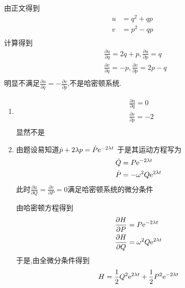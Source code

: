 \begin{solution}
    由正文得到
    \begin{align*}
        u&=q^2+qp\\
        v&=p^2-qp\\
    \end{align*}
    计算得到
    \begin{align*}
        &\frac{\partial u}{\partial q}=2q+p,\frac{\partial u}{\partial p}=q\\
        &\frac{\partial v}{\partial q}=-p,\frac{\partial v}{\partial p}=2p-q\\
    \end{align*}
    明显不满足$\frac{\partial u}{\partial q}=-\frac{\partial v}{\partial p}$,不是哈密顿系统.
\end{solution}
\begin{solution}
    \begin{enumerate}[label=(\arabic*)]
        \item \begin{align*}
            &\frac{\partial u}{\partial q}=0\\
            &\frac{\partial v}{\partial p}=-2\\
              \end{align*}
        显然不是
        \item 由题设易知道$\dot p+2\lambda p=\dot P \mathrm e^{-2\lambda t}$
        于是其运动方程写为
        \begin{align*}
            \dot Q&=P\mathrm e^{-2\lambda t}\\
            \dot P&=-\omega^2 Q\mathrm e^{2\lambda t}
        \end{align*}
        此时$\frac{\partial u}{\partial Q}=\frac{\partial v}{\partial P}=0$满足哈密顿系统的微分条件

        由哈密顿方程得到
        \begin{align*}
            \frac{\partial H}{\partial P}&=P\mathrm e^{-2\lambda t}\\
            \frac{\partial H}{\partial Q}&=\omega^2 Q\mathrm e^{2\lambda t}
        \end{align*}
        于是,由全微分条件得到
        $$H=\frac12 Q^2\mathrm e^{2\lambda t}+\frac12 P^2\mathrm e^{-2\lambda t}$$
    \end{enumerate}
\end{solution}
